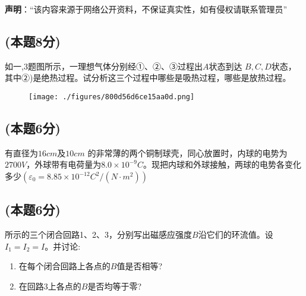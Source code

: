 
\textbf{声明}：“该内容来源于网络公开资料，不保证真实性，如有侵权请联系管理员”

\subsection{(本题8分)}
如一,3题图所示，一理想气体分别经①、②、③过程出$A$状态到达 $B,C,D$状态，其中②)是绝热过程。试分析这三个过程中哪些是吸热过程，哪些是放热过程。
\begin{figure}[ht]
\centering
\texttt{[image: ./figures/800d56d6ce15aa0d.png]}
\caption{} \label{fig_CD13_1}
\end{figure}
\subsection{(本题6分)}
有直径为$16cm$及$10cm$ 的非常薄的两个铜制球壳，同心放置时，内球的电势为 $2700V$，外球带有电荷量为$8.0\times10^{-9}C$。现把内球和外球接触，两球的电势各变化多少$(\varepsilon_0=8.85\times10^{-12} C^2/(N\cdot m^2))$
\subsection{(本题6分)}
所示的三个闭合回路1、2、3，分别写出磁感应强度$B$沿它们的环流值。设$I_1=I_2=I$。并讨论:
\begin{enumerate}
\item 在每个闭合回路上各点的$B$值是否相等?
\item 在回路3上各点的$B$是否均等于零?
\end{enumerate}
